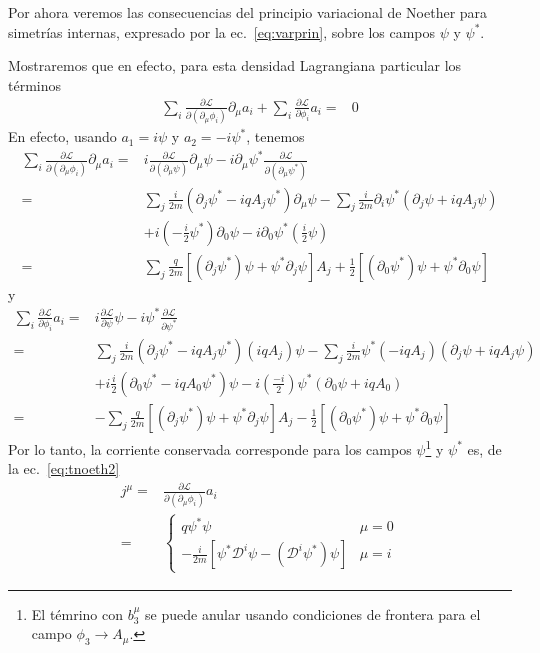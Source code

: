 \begin{subappendices}
Por ahora veremos las consecuencias del principio variacional de Noether para simetrías internas, expresado por la ec.~\eqref{eq:varprin}, sobre los campos $\psi$ y $\psi^{*}$.

Mostraremos que en efecto, para esta densidad Lagrangiana particular los términos 
\begin{align*}
\sum_i \frac{\partial\mathcal{L}}{\partial(\partial_{\mu}\phi_i)}\partial_{\mu}a_i+
\sum_i  \frac{\partial\mathcal{L}}{\partial\phi_i}a_i =&0
\end{align*}
En efecto, usando $a_1=i \psi$ y $a_2=-i \psi^*$, tenemos
\begin{align}
\sum_i \frac{\partial\mathcal{L}}{\partial(\partial_{\mu}\phi_i)}\partial_{\mu}a_i=&
i   \frac{\partial\mathcal{L}}{\partial(\partial_{\mu}\psi)} \partial_{\mu}\psi
-i  \partial_{\mu}\psi^*   \frac{\partial\mathcal{L}}{\partial(\partial_{\mu}\psi^*)}\nonumber\\
=&\sum_j \frac{i}{2m} \left(\partial_j\psi^*-iq A_j\psi^* \right) \partial_{\mu}\psi
-\sum_j\frac{i}{2m}\partial_i\psi^* \left(\partial_j\psi+iq A_j\psi \right)\nonumber\\
&+i   \left(-\frac{i}{2}\psi^*\right)      \partial_0\psi 
-i  \partial_0\psi^*     \left(\frac{i}{2}\psi\right) \nonumber\\
=&\sum_j\frac{q}{2m} \left[\left(\partial_j\psi^* \right)\psi+\psi^*\partial_j\psi\right] A_j
+\frac{1}{2}\left[  \left(\partial_0\psi^*\right)\psi+\psi^*\partial_0\psi\right]
\end{align}
y
\begin{align}
\sum_i  \frac{\partial\mathcal{L}}{\partial\phi_i}a_i =&
i \frac{\partial\mathcal{L}}{\partial\psi} \psi
-i \psi^*\frac{\partial\mathcal{L}}{\partial\psi^*}\nonumber\\
=&\sum_j\frac{i}{2m} \left(\partial_j\psi^*-iq A_j\psi^* \right)\left(iqA_j\right)\psi
-\sum_j\frac{i}{2m}\psi^* \left(-iqA_j\right) \left(\partial_j\psi+iq A_j\psi \right)\nonumber\\
&+i  \frac{i}{2}              \left(\partial_0\psi^*-    iqA_0\psi^*\right)        \psi
-i\left(\frac{-i}{2}\right)\psi^*\left(\partial_0\psi+iqA_0\right) \nonumber\\
=&-\sum_j\frac{q}{2m} \left[\left(\partial_j\psi^* \right)\psi+\psi^*\partial_j\psi\right] A_j
-\frac{1}{2}\left[  \left(\partial_0\psi^*\right)\psi+\psi^*\partial_0\psi\right]
\end{align}
Por lo tanto, la corriente conservada corresponde para los campos $\psi$\footnote{El témrino con $b_3^{\mu}$ se puede anular usando condiciones de frontera para el campo $\phi_3\to A_{\mu}$.}
y $\psi^*$  es, de la ec.~\eqref{eq:tnoeth2} 
\begin{align}
j^\mu=&\frac{\partial\mathcal{L}}{\partial(\partial_{\mu}\phi_i)}a_i\nonumber\\
 =&\begin{cases}
q \psi^{*}\psi & \mu=0\\
-\frac{i}{2m} \left[ \psi^{*}\mathcal{D}^i\psi-\left( \mathcal{D}^i\psi^{*} \right)\psi \right] & \mu=i
  \end{cases}
\end{align}



\end{subappendices}
